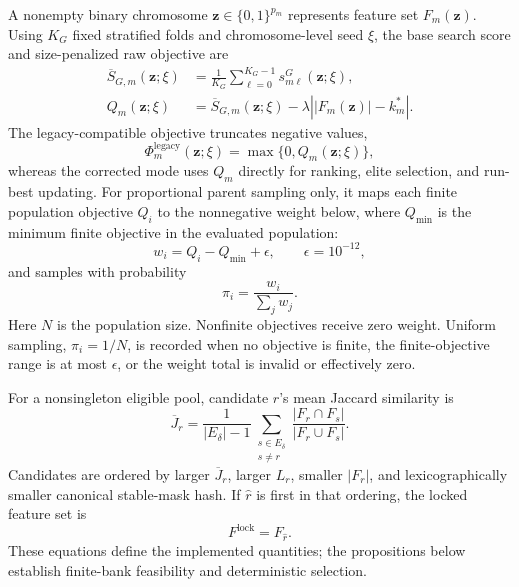 A nonempty binary chromosome \(\mathbf z\in\{0,1\}^{p_m}\) represents feature set \(F_m(\mathbf z)\). Using \(K_G\) fixed stratified folds and chromosome-level seed \(\xi\), the base search score and size-penalized raw objective are
\begin{align}
\overline S_{G,m}(\mathbf z;\xi)&=\frac{1}{K_G}\sum_{\ell=0}^{K_G-1}s^{G}_{m\ell}(\mathbf z;\xi),\\
Q_m(\mathbf z;\xi)&=\overline S_{G,m}(\mathbf z;\xi)-\lambda\left||F_m(\mathbf z)|-k_m^{\ast}\right|.
\end{align}
The legacy-compatible objective truncates negative values,
\begin{equation}
\Phi_m^{\mathrm{legacy}}(\mathbf z;\xi)=\max\{0,Q_m(\mathbf z;\xi)\},
\end{equation}
whereas the corrected mode uses $Q_m$ directly for ranking, elite selection, and run-best updating. For proportional parent sampling only, it maps each finite population objective $Q_i$ to the nonnegative weight below, where $Q_{\min}$ is the minimum finite objective in the evaluated population:
\begin{equation}
w_i=Q_i-Q_{\min}+\epsilon,\qquad \epsilon=10^{-12},
\end{equation}
and samples with probability
\begin{equation}
\pi_i=\frac{w_i}{\sum_jw_j}.
\end{equation}
Here $N$ is the population size. Nonfinite objectives receive zero weight. Uniform sampling, $\pi_i=1/N$, is recorded when no objective is finite, the finite-objective range is at most $\epsilon$, or the weight total is invalid or effectively zero.

For a nonsingleton eligible pool, candidate $r$'s mean Jaccard similarity is
\begin{equation}
\overline J_r=\frac{1}{|E_\delta|-1}\sum_{\substack{s\in E_\delta\\s\ne r}}
\frac{|F_r\cap F_s|}{|F_r\cup F_s|}.
\end{equation}
Candidates are ordered by larger $\overline J_r$, larger $L_r$, smaller $|F_r|$, and lexicographically smaller canonical stable-mask hash. If $\widehat r$ is first in that ordering, the locked feature set is
\begin{equation}
F^{\mathrm{lock}}=F_{\widehat r}.
\end{equation}
These equations define the implemented quantities; the propositions below establish finite-bank feasibility and deterministic selection.

